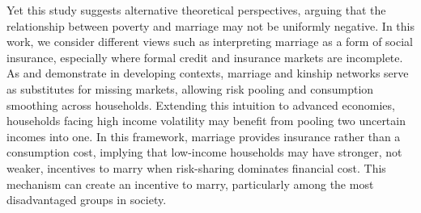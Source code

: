 Yet this study suggests alternative theoretical perspectives, arguing that the relationship between poverty and marriage may not be uniformly negative. In this work, we consider different views such as interpreting marriage as a form of social insurance, especially where formal credit and insurance markets are incomplete. As \citet{RosenzweigStark1989} and \citet{Townsend1994} demonstrate in developing contexts, marriage and kinship networks serve as substitutes for missing markets, allowing risk pooling and consumption smoothing across households. Extending this intuition to advanced economies, households facing high income volatility may benefit from pooling two uncertain incomes into one. In this framework, marriage provides insurance rather than a consumption cost, implying that low-income households may have stronger, not weaker, incentives to marry when risk-sharing dominates financial cost. This mechanism can create an incentive to marry, particularly among the most disadvantaged groups in society. 


